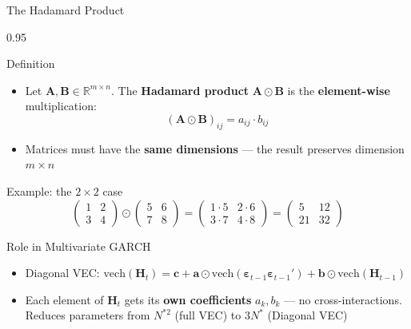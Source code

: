 \documentclass[9pt, aspectratio=169, t]{beamer}
\begin{document}
\begin{frame}{The Hadamard Product}
    \begin{cminipage}{0.95\textwidth}
    {\footnotesize
    \begin{block}{Definition}
        \begin{itemize}\setlength{\itemsep}{0pt}
            \item Let $\mathbf{A}, \mathbf{B} \in \mathbb{R}^{m \times n}$. The \textbf{Hadamard product} $\mathbf{A} \odot \mathbf{B}$ is the \textbf{element-wise} multiplication:
            \[
                (\mathbf{A} \odot \mathbf{B})_{ij} = a_{ij} \cdot b_{ij}
            \]
            \item Matrices must have the \textbf{same dimensions} --- the result preserves dimension $m \times n$
        \end{itemize}
    \end{block}
    \vspace{-2mm}
    \begin{block}{Example: the $2 \times 2$ case}
        \[
            \begin{pmatrix} 1 & 2 \\ 3 & 4 \end{pmatrix} \odot \begin{pmatrix} 5 & 6 \\ 7 & 8 \end{pmatrix} = \begin{pmatrix} 1 \cdot 5 & 2 \cdot 6 \\ 3 \cdot 7 & 4 \cdot 8 \end{pmatrix} = \begin{pmatrix} 5 & 12 \\ 21 & 32 \end{pmatrix}
        \]
    \end{block}
    \vspace{-2mm}
    \begin{alertblock}{Role in Multivariate GARCH}
        \begin{itemize}\setlength{\itemsep}{0pt}
            \item Diagonal VEC: $\text{vech}(\mathbf{H}_t) = \mathbf{c} + \mathbf{a} \odot \text{vech}(\boldsymbol{\varepsilon}_{t-1}\boldsymbol{\varepsilon}_{t-1}') + \mathbf{b} \odot \text{vech}(\mathbf{H}_{t-1})$
            \item Each element of $\mathbf{H}_t$ gets its \textbf{own coefficients} $a_k, b_k$ --- no cross-interactions. Reduces parameters from $N^{*2}$ (full VEC) to $3N^*$ (Diagonal VEC)
        \end{itemize}
    \end{alertblock}
    }
    \end{cminipage}
\end{frame}
\end{document}
